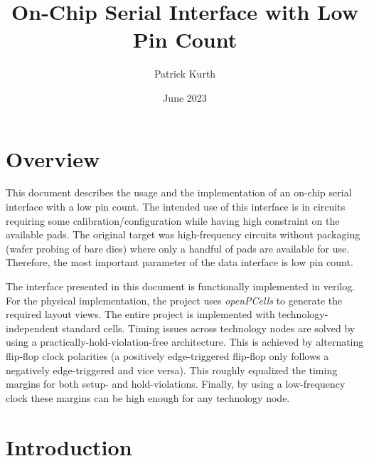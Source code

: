 \documentclass[parskip=half]{scrartcl}
\title{On-Chip Serial Interface with Low Pin Count}
\author{Patrick Kurth}
\date{June 2023}
\begin{document}
    \maketitle
    \section{Overview}
    This document describes the usage and the implementation of an on-chip serial interface with a low pin count.
    The intended use of this interface is in circuits requiring some calibration/configuration while having high constraint on the available pads.
    The original target was high-frequency circuits without packaging (wafer probing of bare dies) where only a handful of pads are available for
    use. Therefore, the most important parameter of the data interface is low pin count.

    The interface presented in this document is functionally implemented in verilog.
    For the physical implementation, the project uses \emph{openPCells} to generate the required layout views.
    The entire project is implemented with technology-independent standard cells.
    Timing issues across technology nodes are solved by using a practically-hold-violation-free architecture.
    This is achieved by alternating flip-flop clock polarities (a positively edge-triggered flip-flop only follows a negatively edge-triggered and
    vice versa).
    This roughly equalized the timing margins for both setup- and hold-violations.
    Finally, by using a low-frequency clock these margins can be high enough for any technology node.
    \section{Introduction}
\end{document}
